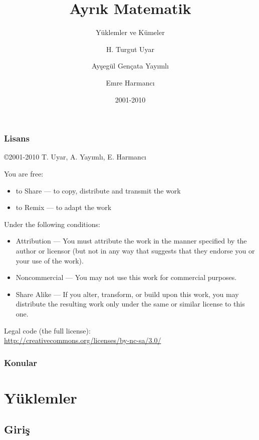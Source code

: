 \documentclass[dvipsnames]{beamer}
\title{Ayrık Matematik}
\subtitle{Yüklemler ve Kümeler}
\author{H. Turgut Uyar \and Ayşegül Gençata Yayımlı \and Emre Harmancı}
\date{2001-2010}
\theoremstyle{definition}
\theoremstyle{example}
\theoremstyle{plain}
\begin{document}
\begin{frame}
  \titlepage
\end{frame}

\begin{frame}
  \frametitle{Lisans}

  \hfill
  \copyright 2001-2010 T. Uyar, A. Yayımlı, E. Harmancı

  \vfill
  \begin{tiny}
    You are free:
    \begin{itemize}
      \item to Share — to copy, distribute and transmit the work
      \item to Remix — to adapt the work
    \end{itemize}

    Under the following conditions:
    \begin{itemize}
      \item Attribution — You must attribute the work in the manner specified by
        the author or licensor (but not in any way that suggests that they
        endorse you or your use of the work).

      \item Noncommercial — You may not use this work for commercial purposes.

      \item Share Alike — If you alter, transform, or build upon this work, you
        may distribute the resulting work only under the same or similar license
        to this one.
    \end{itemize}
  \end{tiny}

  \vfill
  Legal code (the full license):\\
  \url{http://creativecommons.org/licenses/by-nc-sa/3.0/}
\end{frame}

\begin{frame}
  \frametitle{Konular}
  \tableofcontents
\end{frame}

\section{Yüklemler}

\subsection{Giriş}
\end{document}
